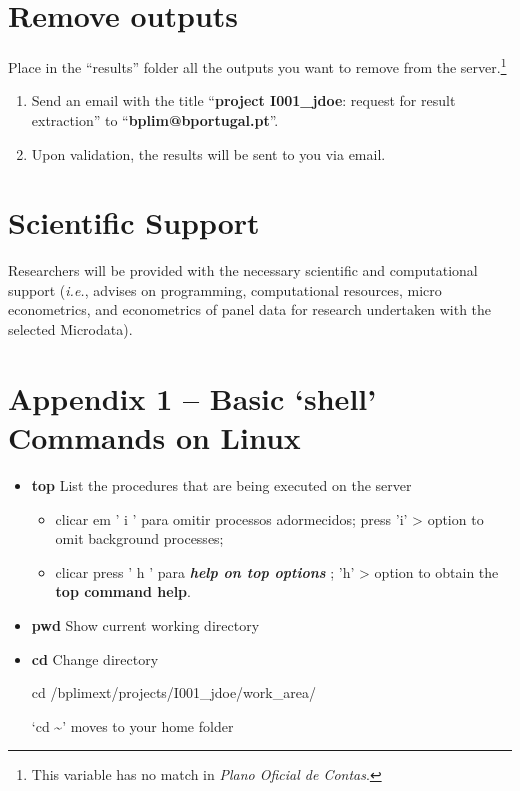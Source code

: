 \documentclass[]{book}
\let\rmarkdownfootnote\footnote%
\def\footnote{\protect\rmarkdownfootnote}
\begin{document}
\hypertarget{remove-outputs}{%
\section{\texorpdfstring{{Remove outputs}}{Remove outputs}}\label{remove-outputs}}

Place in the ``{results}'' folder all the outputs you want
to remove from the server.\footnote{This variable has no match in \emph{Plano Oficial de Contas}.}

\begin{enumerate}
\def\labelenumi{\arabic{enumi}.}
\item
  Send an email with the title
  ``\textbf{project I001\_jdoe}: request for result extraction'' to
  ``\textbf{{bplim@bportugal.pt}}''.
\item
  Upon validation, the results will be sent to you via email.
\end{enumerate}

\hypertarget{scientific-support}{%
\section{\texorpdfstring{{Scientific Support}}{Scientific Support}}\label{scientific-support}}

Researchers will be provided with the necessary scientific and
computational support (\emph{i.e.}, advises on programming, computational
resources, micro econometrics, and econometrics of panel data for
research undertaken with the selected Microdata).

\hypertarget{appendix-1-basic-shell-commands-on-linux}{%
\section{\texorpdfstring{{Appendix 1 -- Basic `shell' Commands on Linux}}{Appendix 1 -- Basic `shell' Commands on Linux}}\label{appendix-1-basic-shell-commands-on-linux}}

\begin{itemize}
\item
  \textbf{top} List the procedures that are being executed on the
  server

  \begin{itemize}
  \item
    clicar em ' i ' para omitir processos adormecidos; press 'i'
    \textgreater{} option to omit background processes;
  \item
    clicar press ' h ' para \textbf{\emph{help on top options}} ; 'h'
    \textgreater{} option to obtain the \textbf{top command help}.
  \end{itemize}
\item
  \textbf{pwd} Show current working
  directory
\item
  \textbf{cd} Change directory

  cd /bplimext/projects/I001\_jdoe/work\_area/

  `cd \textasciitilde{}' moves to your home folder
\end{itemize}
\end{document}
